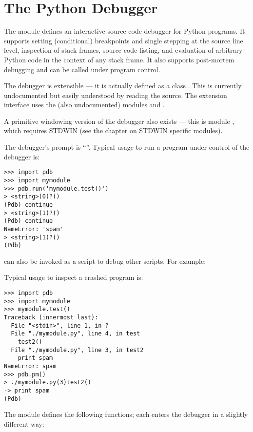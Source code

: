 \chapter{The Python Debugger}

\renewcommand{\indexsubitem}{(in module pdb)}

The module  defines an interactive source code debugger for
Python programs.  It supports setting
(conditional) breakpoints and single stepping
at the source line level, inspection of stack frames, source code
listing, and evaluation of arbitrary Python code in the context of any
stack frame.  It also supports post-mortem debugging and can be called
under program control.

The debugger is extensible --- it is actually defined as a class
.  This is currently undocumented but easily understood by
reading the source.  The extension interface uses the (also
undocumented) modules  and .

A primitive windowing version of the debugger also exists --- this is
module , which requires STDWIN (see the chapter on STDWIN
specific modules).

The debugger's prompt is ``''.
Typical usage to run a program under control of the debugger is:

\begin{verbatim}
>>> import pdb
>>> import mymodule
>>> pdb.run('mymodule.test()')
> <string>(0)?()
(Pdb) continue
> <string>(1)?()
(Pdb) continue
NameError: 'spam'
> <string>(1)?()
(Pdb) 
\end{verbatim}

 can also be invoked as
a script to debug other scripts.  For example:

Typical usage to inspect a crashed program is:

\begin{verbatim}
>>> import pdb
>>> import mymodule
>>> mymodule.test()
Traceback (innermost last):
  File "<stdin>", line 1, in ?
  File "./mymodule.py", line 4, in test
    test2()
  File "./mymodule.py", line 3, in test2
    print spam
NameError: spam
>>> pdb.pm()
> ./mymodule.py(3)test2()
-> print spam
(Pdb) 
\end{verbatim}

The module defines the following functions; each enters the debugger
in a slightly different way:

